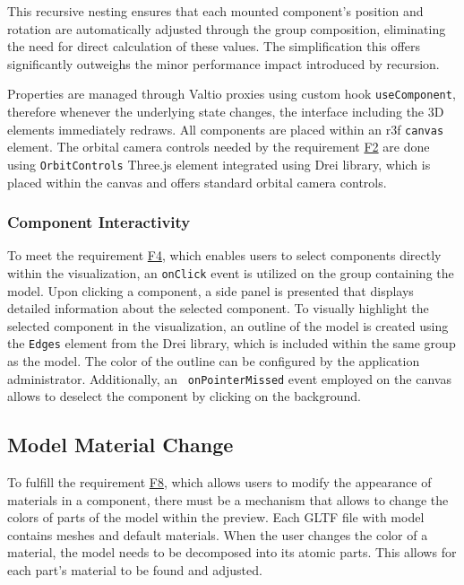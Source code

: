 This recursive nesting ensures that each mounted component's position and rotation are automatically adjusted through the group composition, eliminating the need for direct calculation of these values. The simplification this offers significantly outweighs the minor performance impact introduced by recursion.

Properties are managed through Valtio proxies using custom hook \texttt{useComponent}, therefore whenever the underlying state changes, the interface including the 3D elements immediately redraws.
All components are placed within an \acrshort{r3f} \texttt{canvas} element. The orbital camera controls needed by the requirement \hyperref[itm:F2]{F2} are done using \texttt{OrbitControls} Three.js element integrated using Drei library, which is placed within the canvas and offers standard orbital camera controls.


\subsubsection{Component Interactivity}

To meet the requirement \hyperref[itm:F4]{F4}, which enables users to select components directly within the visualization, an \texttt{onClick} event is utilized on the group containing the model. Upon clicking a component, a side panel is presented that displays detailed information about the selected component. To visually highlight the selected component in the visualization, an outline of the model is created using the \texttt{Edges} element from the Drei library, which is included within the same group as the model. The color of the outline can be configured by the application administrator. Additionally, an \texttt{ onPointerMissed} event employed on the canvas allows to deselect the component by clicking on the background.


\subsection{Model Material Change}

To fulfill the requirement \hyperref[itm:F8]{F8}, which allows users to modify the appearance of materials in a component, there must be a mechanism that allows to change the colors of parts of the model within the preview. Each GLTF file with model contains meshes and default materials. When the user changes the color of a material, the model needs to be decomposed into its atomic parts. This allows for each part's material to be found and adjusted. 

